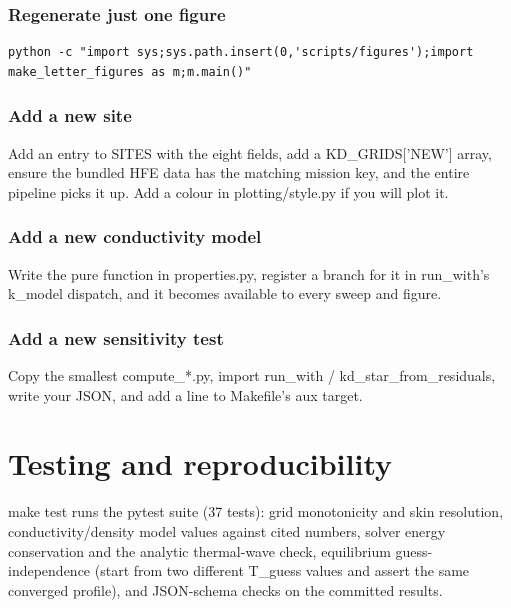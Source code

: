 \documentclass[11pt]{report}
\newcommand{\code}[1]{{\ttfamily\small #1}}
\newcommand{\file}[1]{\textcolor{forest}{\ttfamily #1}}
\begin{document}
\subsection*{Regenerate just one figure}
\begin{lstlisting}[style=sh]
python -c "import sys;sys.path.insert(0,'scripts/figures');import make_letter_figures as m;m.main()"
\end{lstlisting}

\subsection*{Add a new site}
Add an entry to \code{SITES} with the eight fields, add a
\code{KD\_GRIDS['NEW']} array, ensure the bundled HFE data has the matching
\code{mission} key, and the entire pipeline picks it up. Add a colour in
\file{plotting/style.py} if you will plot it.

\subsection*{Add a new conductivity model}
Write the pure function in \file{properties.py}, register a branch for it
in \code{run\_with}'s \code{k\_model} dispatch, and it becomes available to
every sweep and figure.

\subsection*{Add a new sensitivity test}
Copy the smallest \code{compute\_*.py}, import \code{run\_with} /
\code{kd\_star\_from\_residuals}, write your JSON, and add a line to
\file{Makefile}'s \code{aux} target.

\chapter{Testing and reproducibility}

\code{make test} runs the \code{pytest} suite (37 tests): grid
monotonicity and skin resolution, conductivity/density model values
against cited numbers, solver energy conservation and the analytic
thermal-wave check, equilibrium guess-independence (start from two
different \code{T\_guess} values and assert the same converged profile),
and JSON-schema checks on the committed results.
\end{document}
